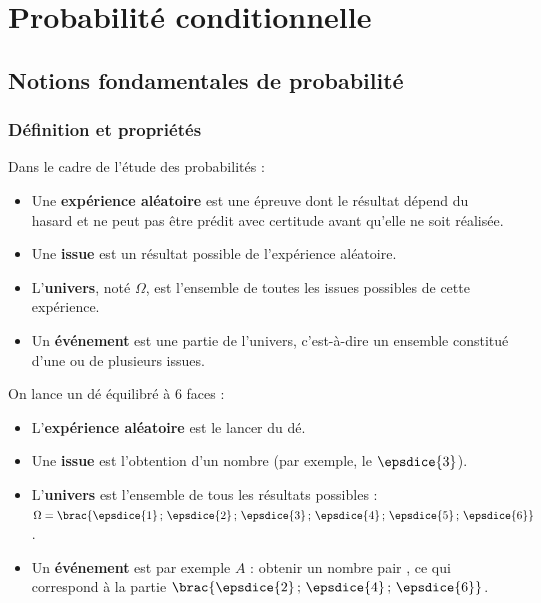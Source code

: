 \chapter{Probabilité conditionnelle}

\section{Notions fondamentales de probabilité}

\subsection{Définition et propriétés}

\begin{defin}
	Dans le cadre de l'étude des probabilités :

	\begin{itemize}
		\item Une \textbf{expérience aléatoire} est une épreuve dont le résultat dépend du hasard et ne peut pas être prédit avec certitude avant qu'elle ne soit réalisée.
		\item Une \textbf{issue} est un résultat possible de l'expérience aléatoire.
		\item L'\textbf{univers}, noté $\Omega$, est l'ensemble de toutes les issues possibles de cette expérience.
		\item Un \textbf{événement} est une partie de l'univers, c'est-à-dire un ensemble constitué d'une ou de plusieurs issues.
	\end{itemize}
\end{defin}

\begin{exemple}
	On lance un dé équilibré à 6 faces :

	\begin{itemize}
		\item L'\textbf{expérience aléatoire} est le lancer du dé.
		\item Une \textbf{issue} est l'obtention d'un nombre (par exemple, le $\epsdice{3}$).
		\item L'\textbf{univers} est l'ensemble de tous les résultats possibles : $\Omega = \brac{\epsdice{1}\,;\,\epsdice{2}\,;\,\epsdice{3}\,;\,\epsdice{4}\,;\,\epsdice{5}\,;\,\epsdice{6}}$.
		\item Un \textbf{événement} est par exemple $A$ : \og obtenir un nombre pair \fg{}, ce qui correspond à la partie $\brac{\epsdice{2}\,;\,\epsdice{4}\,;\,\epsdice{6}}$.
	\end{itemize}
\end{exemple}

